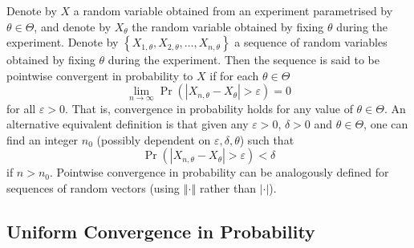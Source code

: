 \documentclass[11pt]{report} %
\begin{document}
Denote by $X$ a random variable obtained from an experiment parametrised by $\theta\in\Theta$, and denote by $X_{\theta}$ the random variable obtained by fixing $\theta$ during the experiment. Denote by $\left\{X_{1, \theta}, X_{2, \theta}, \dots, X_{n, \theta}\right\}$ a sequence of random variables obtained by fixing $\theta$ during the experiment. Then the sequence is said to be pointwise convergent in probability to $X$ if for each $\theta\in\Theta$
\begin{equation}
\lim_{n\to \infty}\operatorname{Pr}\left(\left|X_{n, \theta} - X_{\theta}\right| > \varepsilon\right) = 0
\end{equation}
for all $\varepsilon > 0$. That is, convergence in probability holds for any value of $\theta\in\Theta$. An alternative equivalent definition is that given any $\varepsilon > 0$, $\delta > 0$ and $\theta\in\Theta$, one can find an integer $n_{0}$ (possibly dependent on $\varepsilon, \delta, \theta$) such that
\begin{equation}
\operatorname{Pr}\left(\left|X_{n, \theta} - X_{\theta}\right| > \varepsilon\right) < \delta
\end{equation}
if $n > n_{0}$. Pointwise convergence in probability can be analogously defined for sequences of random vectors (using $\left\Vert\cdot\right\Vert$ rather than $\left|\cdot\right|$).

\subsection{Uniform Convergence in Probability}
\end{document}
